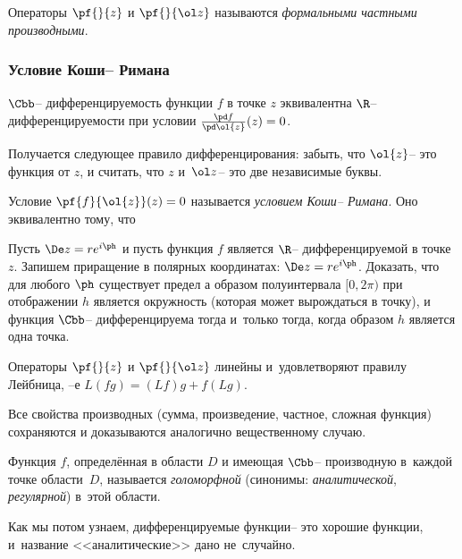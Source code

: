 \documentclass[a4paper]{article}
\begin{document}
\begin{df}
Операторы $\pf{}{z}$ и $\pf{}{\ol z}$ называются \emph{формальными частными производными}.
\end{df}

\subsubsection{Условие Коши-- Римана}

\begin{prop}
$\Cbb$-- дифференцируемость функции $f$ в точке $z$ эквивалентна $\R$-- дифференцируемости
при условии $\frac{\pd f}{\pd \ol{z}}(z) = 0$.
\end{prop}

Получается следующее правило дифференцирования: забыть, что $ \ol{z}$-- это функция от $z$, и считать,
что $z$ и~$\ol z$-- это две независимые буквы.

Условие $\pf{f}{\ol{z}}(z) = 0$ называется \emph{условием Коши-- Римана}. Оно эквивалентно тому, что


\begin{problem}
Пусть $\De z = r e^{i\ph}$ и пусть функция  $f$ является $\R$-- дифференцируемой в точке $z$. Запишем приращение в полярных координатах:
$\De z=re^{i\ph}$. Доказать, что для любого $\ph$ существует предел
а образом полуинтервала $[0, 2\pi)$ при отображении $h$ является окружность (которая может вырождаться в точку),
и функция $\Cbb$-- дифференцируема тогда и~только тогда, когда образом $h$ является одна точка.
\end{problem}

Операторы $\pf{}{z}$ и $\pf{}{\ol z}$ линейны и~удовлетворяют правилу Лейбница, --е $L(fg) = (Lf)g+f(Lg)$.

Все свойства производных (сумма, произведение, частное, сложная функция) сохраняются и доказываются аналогично
вещественному случаю.

\begin{df}
Функция $f$, определённая в области $D$ и имеющая $\Cbb$-- производную в~каждой точке области~$D$, называется
\emph{голоморфной} (синонимы: \emph{аналитической}, \emph{регулярной}) в~этой области.
\end{df}

Как мы потом узнаем, дифференцируемые функции-- это хорошие функции, и~название <<аналитические>> дано не~случайно.
\end{document}
